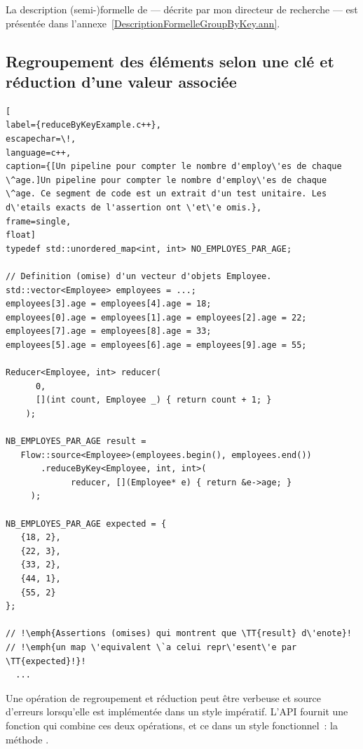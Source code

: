 
La description (semi-)formelle de  --- d\'ecrite par mon directeur de recherche --- est pr\'esent\'ee dans l'annexe~\ref{DescriptionFormelleGroupByKey.ann}.




\subsection{Regroupement des \'el\'ements selon une cl\'e et r\'eduction d'une valeur associ\'ee}

\label{reduceByKey.sect}

\begin{lstlisting}[
label={reduceByKeyExample.c++},
escapechar=\!,
language=c++,
caption={[Un pipeline pour compter le nombre d'employ\'es de chaque \^age.]Un pipeline pour compter le nombre d'employ\'es de chaque \^age. Ce segment de code est un extrait d'un test unitaire. Les d\'etails exacts de l'assertion ont \'et\'e omis.},
frame=single,
float]
typedef std::unordered_map<int, int> NO_EMPLOYES_PAR_AGE;

// Definition (omise) d'un vecteur d'objets Employee.
std::vector<Employee> employees = ...; 
employees[3].age = employees[4].age = 18;
employees[0].age = employees[1].age = employees[2].age = 22;
employees[7].age = employees[8].age = 33;
employees[5].age = employees[6].age = employees[9].age = 55;

Reducer<Employee, int> reducer(
      0,
      [](int count, Employee _) { return count + 1; }
    );

NB_EMPLOYES_PAR_AGE result = 
   Flow::source<Employee>(employees.begin(), employees.end())
       .reduceByKey<Employee, int, int>(
             reducer, [](Employee* e) { return &e->age; }
     );
    
NB_EMPLOYES_PAR_AGE expected = {
   {18, 2},
   {22, 3},
   {33, 2},
   {44, 1},
   {55, 2}
};

// !\emph{Assertions (omises) qui montrent que \TT{result} d\'enote}!
// !\emph{un map \'equivalent \`a celui repr\'esent\'e par \TT{expected}!}!
  ...
\end{lstlisting}

Une op\'eration de regroupement et r\'eduction peut \^etre verbeuse et source d'erreurs lorsqu'elle est impl\'ement\'ee dans un style imp\'eratif. L'{API} fournit une fonction qui combine ces deux op\'erations, et ce  dans un style fonctionnel~: la m\'ethode .

